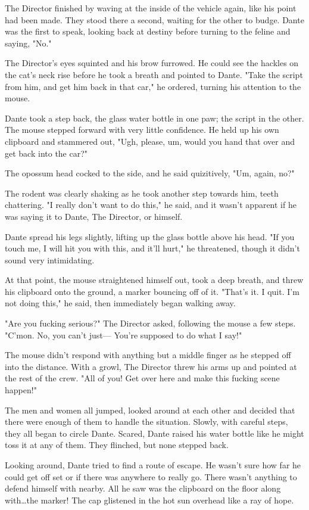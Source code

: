 The Director finished by waving at the inside of the vehicle again, like his point had been made. They stood there a second, waiting for the other to budge. Dante was the first to speak, looking back at destiny before turning to the feline and saying, "No."

The Director's eyes squinted and his brow furrowed. He could see the hackles on the cat's neck rise before he took a breath and pointed to Dante. "Take the script from him, and get him back in that car," he ordered, turning his attention to the mouse.

Dante took a step back, the glass water bottle in one paw; the script in the other. The mouse stepped forward with very little confidence. He held up his own clipboard and stammered out, "Ugh, please, um, would you hand that over and get back into the car?"

The opossum head cocked to the side, and he said quizitively, "Um, again, no?"

The rodent was clearly shaking as he took another step towards him, teeth chattering. "I really don't want to do this," he said, and it wasn't apparent if he was saying it to Dante, The Director, or himself.

Dante spread his legs slightly, lifting up the glass bottle above his head. "If you touch me, I will hit you with this, and it'll hurt," he threatened, though it didn't sound very intimidating.

At that point, the mouse straightened himself out, took a deep breath, and threw his clipboard onto the ground, a marker bouncing off of it. "That's it. I quit. I'm not doing this," he said, then immediately began walking away.

"Are you fucking serious?" The Director asked, following the mouse a few steps. "C'mon. No, you can't just--- You're supposed to do what I say!"

The mouse didn't respond with anything but a middle finger as he stepped off into the distance. With a growl, The Director threw his arms up and pointed at the rest of the crew. "All of you! Get over here and make this fucking scene happen!"

The men and women all jumped, looked around at each other and decided that there were enough of them to handle the situation. Slowly, with careful steps, they all began to circle Dante. Scared, Dante raised his water bottle like he might toss it at any of them. They flinched, but none stepped back.

Looking around, Dante tried to find a route of escape. He wasn't sure how far he could get off set or if there was anywhere to really go. There wasn't anything to defend himself with nearby. All he saw was the clipboard on the floor along with\ldots the marker! The cap glistened in the hot sun overhead like a ray of hope.


